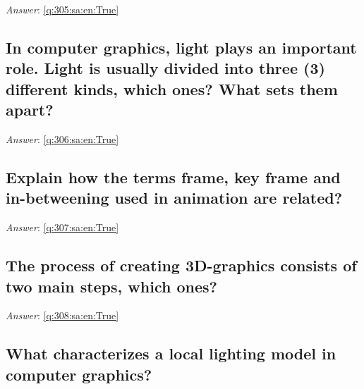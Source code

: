 \documentclass[a4paper,11pt,oneside]{article}
\begin{document}
\begin{sloppypar}
\vspace{1cm}

\textit{Answer}: \autoref{q:305:sa:en:True}



\subsection{In computer graphics, light plays an important role. Light is usually divided into three (3) different kinds, which ones? What sets them apart?}

\label{q:306:sa:en:False}

\vspace{2cm}

\noindent\makebox[\textwidth]{\hrulefill}

\vspace{1cm}

\textit{Answer}: \autoref{q:306:sa:en:True}



\subsection{Explain how the terms frame, key frame and in-betweening used in animation are related?}

\label{q:307:sa:en:False}

\vspace{2cm}

\noindent\makebox[\textwidth]{\hrulefill}

\vspace{1cm}

\textit{Answer}: \autoref{q:307:sa:en:True}



\subsection{The process of creating 3D-graphics consists of two main steps, which ones?}

\label{q:308:sa:en:False}

\vspace{2cm}

\noindent\makebox[\textwidth]{\hrulefill}

\vspace{1cm}

\textit{Answer}: \autoref{q:308:sa:en:True}



\subsection{What characterizes a local lighting model in computer graphics?}


\end{sloppypar}
\end{document}
